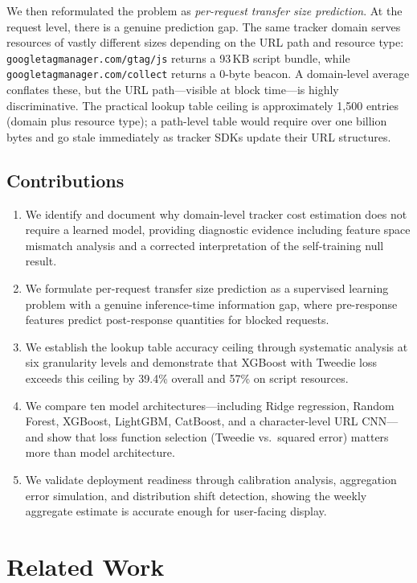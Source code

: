 \documentclass[11pt]{article}
\begin{document}
We then reformulated the problem as \emph{per-request transfer size prediction}. At the request level, there is a genuine prediction gap. The same tracker domain serves resources of vastly different sizes depending on the URL path and resource type: \texttt{googletagmanager.com/gtag/js} returns a 93\,KB script bundle, while \texttt{googletagmanager.com/collect} returns a 0-byte beacon. A domain-level average conflates these, but the URL path---visible at block time---is highly discriminative. The practical lookup table ceiling is approximately 1,500 entries (domain plus resource type); a path-level table would require over one billion bytes and go stale immediately as tracker SDKs update their URL structures.

\subsection{Contributions}

\begin{enumerate}
    \item We identify and document why domain-level tracker cost estimation does not require a learned model, providing diagnostic evidence including feature space mismatch analysis and a corrected interpretation of the self-training null result.
    \item We formulate per-request transfer size prediction as a supervised learning problem with a genuine inference-time information gap, where pre-response features predict post-response quantities for blocked requests.
    \item We establish the lookup table accuracy ceiling through systematic analysis at six granularity levels and demonstrate that XGBoost with Tweedie loss exceeds this ceiling by 39.4\% overall and 57\% on script resources.
    \item We compare ten model architectures---including Ridge regression, Random Forest, XGBoost, LightGBM, CatBoost, and a character-level URL CNN---and show that loss function selection (Tweedie vs.\ squared error) matters more than model architecture.
    \item We validate deployment readiness through calibration analysis, aggregation error simulation, and distribution shift detection, showing the weekly aggregate estimate is accurate enough for user-facing display.
\end{enumerate}


\section{Related Work}
\label{sec:related}
\end{document}
